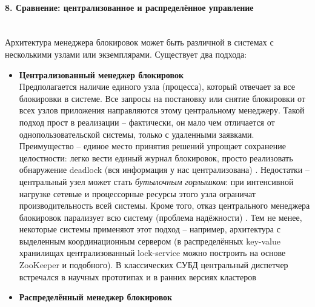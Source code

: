 \paragraph{8. Сравнение: централизованное и распределённое управление} ~\\
 Архитектура менеджера блокировок может быть различной в системах с несколькими узлами или экземплярами. Существует два подхода: 
 \begin{itemize}
    \item \textbf{Централизованный менеджер блокировок} ~\\
    Предполагается наличие единого узла (процесса), который отвечает за все блокировки в системе. Все запросы на постановку или снятие блокировки от всех узлов приложения направляются этому центральному менеджеру. Такой подход прост в реализации – фактически, он мало чем отличается от однопользовательской системы, только с удаленными заявками. Преимущество – единое место принятия решений упрощает сохранение целостности: легко вести единый журнал блокировок, просто реализовать обнаружение deadlock (вся информация у нас централизована) \autocite{Silberschatz}. Недостатки – центральный узел может стать \textit{бутылочным горлышком}: при интенсивной нагрузке сетевые и процессорные ресурсы этого узла ограничат производительность всей системы. Кроме того, отказ центрального менеджера блокировок парализует всю систему (проблема надёжности) \autocite{Silberschatz}. Тем не менее, некоторые системы применяют этот подход – например, архитектура с выделенным координационным сервером (в распределённых key-value хранилищах централизованный lock-service можно построить на основе ZooKeeper и подобного). В классических СУБД центральный диспетчер встречался в научных прототипах и в ранних версиях кластеров
    \item \textbf{Распределённый менеджер блокировок} ~\\

\end{itemize}
